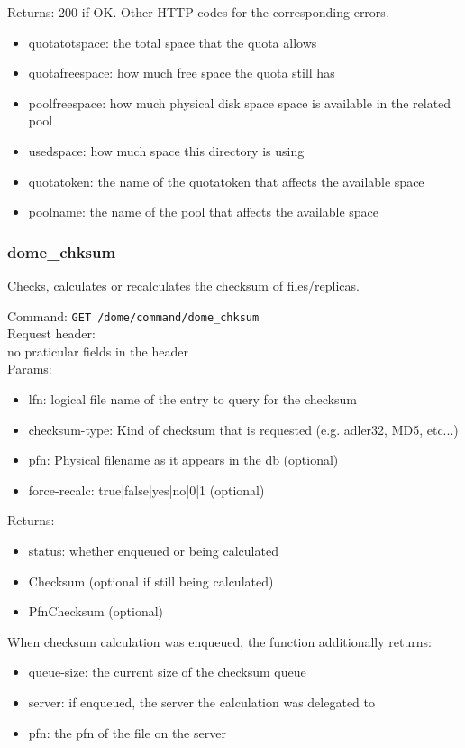 \documentclass[a4paper,10pt]{scrreprt}
\begin{document}
Returns: 200 if OK. Other HTTP codes for the corresponding errors.
\begin{itemize}
  \item quotatotspace: the total space that the quota allows
  \item quotafreespace: how much free space the quota still has
  \item poolfreespace: how much physical disk space space is available in the related pool
  \item usedspace: how much space this directory is using
  \item quotatoken: the name of the quotatoken that affects the available space
  \item poolname: the name of the pool that affects the available space
\end{itemize}



\subsubsection{dome\_chksum}
 Checks, calculates or recalculates the checksum of files/replicas.


Command:
\lstinline"GET /dome/command/dome_chksum"\\

Request header:\\
no praticular fields in the header\\

Params:
\begin{itemize}
 \item lfn: logical file name of the entry to query for the checksum
 \item checksum-type: Kind of checksum that is requested (e.g. adler32, MD5, etc...)
 \item pfn: Physical filename as it appears in the db (optional)
 \item force-recalc: true|false|yes|no|0|1 (optional)
\end{itemize}

Returns:
\begin{itemize}
 \item status: whether enqueued or being calculated
 \item Checksum (optional if still being calculated)
 \item PfnChecksum (optional)

\end{itemize}

When checksum calculation was enqueued, the function additionally returns:
\begin{itemize}
 \item queue-size: the current size of the checksum queue
 \item server: if enqueued, the server the calculation was delegated to
 \item pfn: the pfn of the file on the server
\end{itemize}
\end{document}

